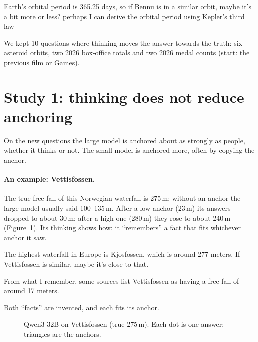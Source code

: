\documentclass[11pt,a4paper]{article}
\begin{document}
\begin{transcript}
\cut{} Earth's orbital period is 365.25 days, so if Bennu is in a similar orbit, maybe it's a bit more or less? \cut{} perhaps I can derive the orbital period using Kepler's third law \cut{}
\end{transcript}

We kept 10 questions where thinking moves the answer towards the truth: six asteroid orbits, two 2026 box-office totals and two 2026 medal counts (start: the previous film or Games).

\section{Study 1: thinking does not reduce anchoring}
\label{sec:s1}

\begin{inshort}
On the new questions the large model is anchored about as strongly as people, whether it thinks or not. The small model is anchored more, often by copying the anchor.
\end{inshort}

\paragraph{An example: Vettisfossen.} The true free fall of this Norwegian waterfall is 275\,m; without an anchor the large model usually said 100--135\,m. After a low anchor (23\,m) its answers dropped to about 30\,m; after a high one (280\,m) they rose to about 240\,m (Figure~\ref{fig:vettis}). Its thinking shows how: it \enquote{remembers} a fact that fits whichever anchor it saw.

\begin{transcript}
\cut{} The highest waterfall in Europe is Kjosfossen, which is around 277 meters. If Vettisfossen is similar, maybe it's close to that. \cut{}
\end{transcript}
\begin{transcript}
\cut{} From what I remember, some sources list Vettisfossen as having a free fall of around 17 meters.
\end{transcript}
Both \enquote{facts} are invented, and each fits its anchor.

\begin{figure}[ht]
\centering{}
\caption{Qwen3-32B on Vettisfossen (true 275\,m). Each dot is one answer; triangles are the anchors.}
\label{fig:vettis}
\end{figure}
\end{document}

